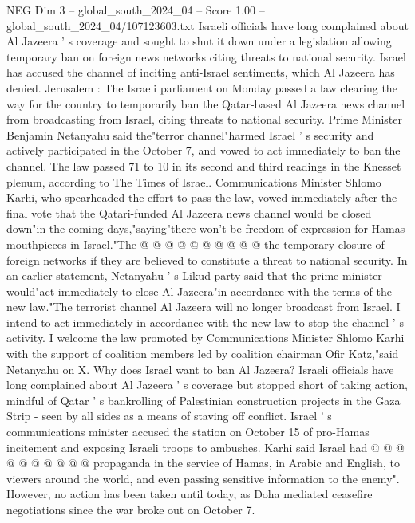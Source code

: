 \begin{textsample}{NEG Dim 3 – global\_south\_2024\_04 – Score 1.00 – global\_south\_2024\_04/107123603.txt}  \label{ex:f3_neg_263}
Israeli officials have long complained about Al Jazeera ' s coverage and sought to shut it down under a legislation allowing temporary ban on foreign news networks citing threats to national security.
Israel has accused the channel of inciting anti-Israel sentiments, which Al Jazeera has denied.
Jerusalem : The Israeli parliament on Monday passed a law clearing the way for the country to temporarily ban the Qatar-based Al Jazeera news channel from broadcasting from Israel, citing threats to national security.
Prime Minister Benjamin Netanyahu said the"terror channel"harmed Israel ' s security and actively participated in the October 7, and vowed to act immediately to ban the channel.
The law passed 71 to 10 in its second and third readings in the Knesset plenum, according to The Times of Israel.
Communications Minister Shlomo Karhi, who spearheaded the effort to pass the law, vowed immediately after the final vote that the Qatari-funded Al Jazeera news channel would be closed down"in the coming days,"saying"there won't be freedom of expression for Hamas mouthpieces in Israel."The @ @ @ @ @ @ @ @ @ @ the temporary closure of foreign networks if they are believed to constitute a threat to national security.
In an earlier statement, Netanyahu ' s Likud party said that the prime minister would"act immediately to close Al Jazeera"in accordance with the terms of the new law."The terrorist channel Al Jazeera will no longer broadcast from Israel.
I intend to act immediately in accordance with the new law to stop the channel ' s activity.
I welcome the law promoted by Communications Minister Shlomo Karhi with the support of coalition members led by coalition chairman Ofir Katz,"said Netanyahu on X.
Why does Israel want to ban Al Jazeera?
Israeli officials have long complained about Al Jazeera ' s coverage but stopped short of taking action, mindful of Qatar ' s bankrolling of Palestinian construction projects in the Gaza Strip - seen by all sides as a means of staving off conflict.
Israel ' s communications minister accused the station on October 15 of pro-Hamas incitement and exposing Israeli troops to ambushes.
Karhi said Israel had @ @ @ @ @ @ @ @ @ @ propaganda in the service of Hamas, in Arabic and English, to viewers around the world, and even passing sensitive information to the enemy".
However, no action has been taken until today, as Doha mediated ceasefire negotiations since the war broke out on October 7.

\end{textsample}
